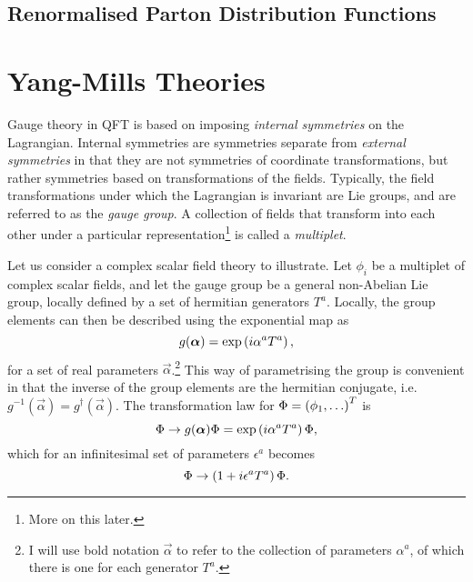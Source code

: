 \documentclass[../main.tex]{subfiles}
\begin{document}





\subsection{Renormalised Parton Distribution Functions}




\section{Yang-Mills Theories}
\label{qft:sec:yang-mills}

Gauge theory in QFT is based on imposing \emph{internal symmetries} on the Lagrangian.
Internal symmetries are symmetries separate from \emph{external symmetries} in that they are not symmetries of coordinate transformations, but rather symmetries based on transformations of the fields.
Typically, the field transformations under which the Lagrangian is invariant are Lie groups, and are referred to as the \emph{gauge group}.
A collection of fields that transform into each other under a particular representation\footnote{More on this later.} is called a \emph{multiplet}.

Let us consider a complex scalar field theory to illustrate.
Let \(\phi_i\) be a multiplet of complex scalar fields, and let the gauge group be a general non-Abelian Lie group, locally defined by a set of hermitian generators \(T^a\).
Locally, the group elements can then be described using the exponential map as\needcite\
\begin{equation}
  \label{qft:eq:exponential_map}
  g(\boldsymbol{\alpha}) = \operatorname{exp}\left(i \alpha^a T^a\right),
\end{equation}
for a set of real parameters \(\vec{\alpha}\).\footnote{I will use bold
  notation \(\vec\alpha\) to refer to the collection of parameters
  \(\alpha^a\), of which there is one for each generator \(T^a\).}
This way of parametrising the group is convenient in that the inverse of the group elements are the hermitian conjugate, i.e.\ \(g^{-1}(\vec\alpha) = g^\dagger(\vec{\alpha})\).
The transformation law for \(\Phi = \left(\phi_1, \ldots\right)^T\) is
\begin{equation}
  \label{qft:eq:gauge_transformation}
  \Phi \to g(\boldsymbol{\alpha}) \Phi = \operatorname{exp}\left(i \alpha^a T^a\right) \Phi,
\end{equation}
which for an infinitesimal set of parameters \(\epsilon^a\) becomes
\begin{equation}
  \Phi \to \left(1 + i \epsilon^a T^a\right) \Phi.
\end{equation}
\medskip
\end{document}
